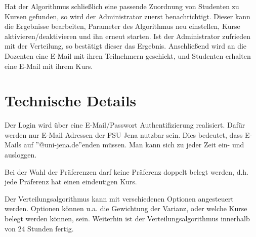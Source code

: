     Hat der Algorithmus schließlich eine passende Zuordnung von Studenten zu Kursen gefunden, so wird der Administrator zuerst benachrichtigt.
    Dieser kann die Ergebnisse bearbeiten, Parameter des Algorithmus neu einstellen, Kurse aktivieren/deaktivieren und ihn erneut starten.
    Ist der Administrator zufrieden mit der Verteilung, so bestätigt dieser das Ergebnis.
    Anschließend wird an die Dozenten eine E-Mail mit ihren Teilnehmern geschickt, und Studenten erhalten eine E-Mail mit ihrem Kurs.
    
    \section{Technische Details}
    Der Login wird über eine E-Mail/Passwort Authentifizierung realisiert.
    Dafür werden nur E-Mail Adressen der FSU Jena nutzbar sein. Dies bedeutet, dass E-Mails auf ''@uni-jena.de''enden müssen.
    Man kann sich zu jeder Zeit ein- und ausloggen.\newline
    
    Bei der Wahl der Präferenzen darf keine Präferenz doppelt belegt werden, d.h. jede Präferenz hat einen eindeutigen Kurs. \newline %
    
    Der Verteilungsalgorithmus kann mit verschiedenen Optionen angesteuert werden. Optionen können u.a. die Gewichtung der Varianz, oder welche Kurse belegt werden können, sein. Weiterhin ist der Verteilungsalgorithmus innerhalb von 24 Stunden fertig. \newline
    
